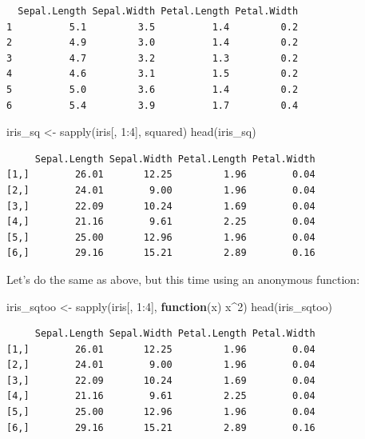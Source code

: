 \documentclass[
]{book}
\newenvironment{Shaded}{\begin{snugshade}}{\end{snugshade}}
\newcommand{\ControlFlowTok}[1]{\textcolor[rgb]{0.13,0.29,0.53}{\textbf{#1}}}
\newcommand{\DecValTok}[1]{\textcolor[rgb]{0.00,0.00,0.81}{#1}}
\newcommand{\FunctionTok}[1]{\textcolor[rgb]{0.00,0.00,0.00}{#1}}
\newcommand{\NormalTok}[1]{#1}
\newcommand{\OtherTok}[1]{\textcolor[rgb]{0.56,0.35,0.01}{#1}}
\newcommand{\SpecialCharTok}[1]{\textcolor[rgb]{0.00,0.00,0.00}{#1}}
\begin{document}
\begin{verbatim}
  Sepal.Length Sepal.Width Petal.Length Petal.Width
1          5.1         3.5          1.4         0.2
2          4.9         3.0          1.4         0.2
3          4.7         3.2          1.3         0.2
4          4.6         3.1          1.5         0.2
5          5.0         3.6          1.4         0.2
6          5.4         3.9          1.7         0.4
\end{verbatim}

\begin{Shaded}
\begin{Highlighting}[]
\NormalTok{iris\_sq }\OtherTok{\textless{}{-}} \FunctionTok{sapply}\NormalTok{(iris[, }\DecValTok{1}\SpecialCharTok{:}\DecValTok{4}\NormalTok{], squared)}
\FunctionTok{head}\NormalTok{(iris\_sq)}
\end{Highlighting}
\end{Shaded}

\begin{verbatim}
     Sepal.Length Sepal.Width Petal.Length Petal.Width
[1,]        26.01       12.25         1.96        0.04
[2,]        24.01        9.00         1.96        0.04
[3,]        22.09       10.24         1.69        0.04
[4,]        21.16        9.61         2.25        0.04
[5,]        25.00       12.96         1.96        0.04
[6,]        29.16       15.21         2.89        0.16
\end{verbatim}

Let's do the same as above, but this time using an anonymous function:

\begin{Shaded}
\begin{Highlighting}[]
\NormalTok{iris\_sqtoo }\OtherTok{\textless{}{-}} \FunctionTok{sapply}\NormalTok{(iris[, }\DecValTok{1}\SpecialCharTok{:}\DecValTok{4}\NormalTok{], }\ControlFlowTok{function}\NormalTok{(x) x}\SpecialCharTok{\^{}}\DecValTok{2}\NormalTok{)}
\FunctionTok{head}\NormalTok{(iris\_sqtoo)}
\end{Highlighting}
\end{Shaded}

\begin{verbatim}
     Sepal.Length Sepal.Width Petal.Length Petal.Width
[1,]        26.01       12.25         1.96        0.04
[2,]        24.01        9.00         1.96        0.04
[3,]        22.09       10.24         1.69        0.04
[4,]        21.16        9.61         2.25        0.04
[5,]        25.00       12.96         1.96        0.04
[6,]        29.16       15.21         2.89        0.16
\end{verbatim}
\end{document}
